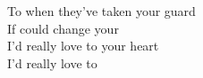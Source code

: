 % 
\songwordfb{} \songwordfb{}
To when they've taken  your guard \songwordfb{} \\
If  could change your  \\
I'd really love to  your heart \songwordfb{} \\
I'd really love to  \\

% 
% 
% 
% 
% 
% 